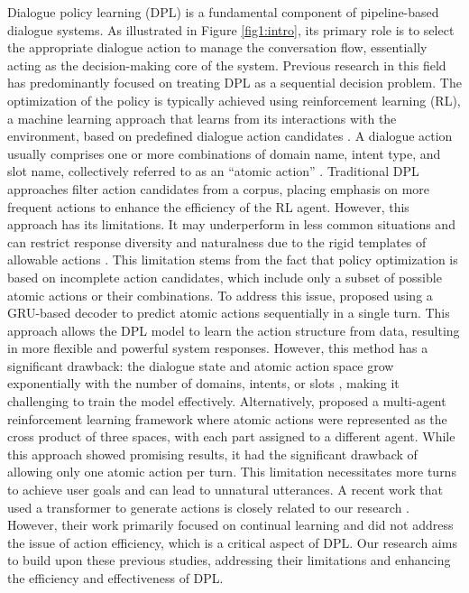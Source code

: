 \documentclass[letterpaper]{article} %
\begin{document}
Dialogue policy learning (DPL) is a fundamental component of pipeline-based dialogue systems. As illustrated in Figure \ref{fig1:intro}, its primary role is to select the appropriate dialogue action to manage the conversation flow, essentially acting as the decision-making core of the system. Previous research in this field has predominantly focused on treating DPL as a sequential decision problem. The optimization of the policy is typically achieved using reinforcement learning (RL), a machine learning approach that learns from its interactions with the environment, based on predefined dialogue action candidates \cite{lipton2016efficient, li2017end, peng2018adversarial,takanobu-etal-2019-guided, wang2020learning, li2020guided, kwan2023survey}. A dialogue action usually comprises one or more combinations of domain name, intent type, and slot name, collectively referred to as an “atomic action” \cite{li2020rethinking}. Traditional DPL approaches filter action candidates from a corpus, placing emphasis on more frequent actions to enhance the efficiency of the RL agent. However, this approach has its limitations. It may underperform in less common situations and can restrict response diversity and naturalness due to the rigid templates of allowable actions \cite{wang-wong-2021-collaborative}. This limitation stems from the fact that policy optimization is based on incomplete action candidates, which include only a subset of possible atomic actions or their combinations. To address this issue, \citet{li2020rethinking} proposed using a GRU-based decoder to predict atomic actions sequentially in a single turn. This approach allows the DPL model to learn the action structure from data, resulting in more flexible and powerful system responses. However, this method has a significant drawback: the dialogue state and atomic action space grow exponentially with the number of domains, intents, or slots \cite{lee-etal-2019-convlab}, making it challenging to train the model effectively. Alternatively, \citet{wang-wong-2021-collaborative} proposed a multi-agent reinforcement learning framework where atomic actions were represented as the cross product of three spaces, with each part assigned to a different agent. While this approach showed promising results, it had the significant drawback of allowing only one atomic action per turn. This limitation necessitates more turns to achieve user goals and can lead to unnatural utterances. A recent work that used a transformer to generate actions is closely related to our research \cite{geishauser-etal-2022-dynamic}. However, their work primarily focused on continual learning and did not address the issue of action efficiency, which is a critical aspect of DPL. Our research aims to build upon these previous studies, addressing their limitations and enhancing the efficiency and effectiveness of DPL.
\end{document}
